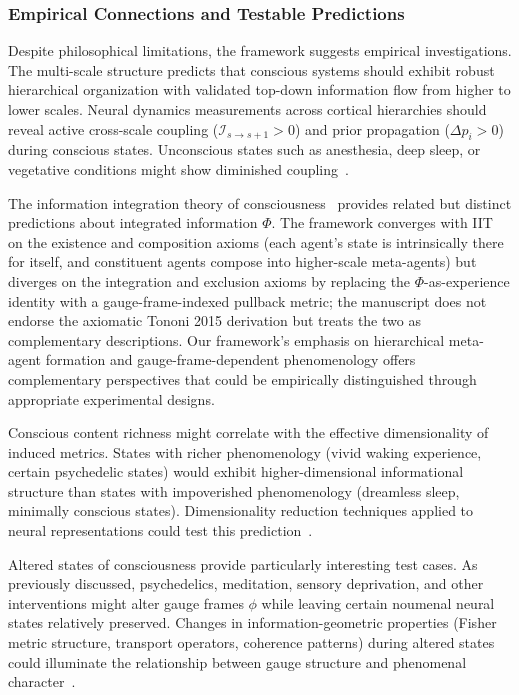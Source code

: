 \documentclass[11pt]{article}
\begin{document}
\subsubsection{Empirical Connections and Testable Predictions}

Despite philosophical limitations, the framework suggests empirical investigations. The multi-scale structure predicts that conscious systems should exhibit robust hierarchical organization with validated top-down information flow from higher to lower scales. Neural dynamics measurements across cortical hierarchies should reveal active cross-scale coupling ($\mathcal{I}_{s \to s+1} > 0$) and prior propagation ($\Delta p_i > 0$) during conscious states. Unconscious states such as anesthesia, deep sleep, or vegetative conditions might show diminished coupling~\cite{Mashour2020, Luppi2021}.

The information integration theory of consciousness~\cite{Tononi2004, Tononi2016} provides related but distinct predictions about integrated information $\Phi$. The framework converges with IIT on the existence and composition axioms (each agent's state is intrinsically there for itself, and constituent agents compose into higher-scale meta-agents) but diverges on the integration and exclusion axioms by replacing the $\Phi$-as-experience identity with a gauge-frame-indexed pullback metric; the manuscript does not endorse the axiomatic Tononi 2015 derivation but treats the two as complementary descriptions. Our framework's emphasis on hierarchical meta-agent formation and gauge-frame-dependent phenomenology offers complementary perspectives that could be empirically distinguished through appropriate experimental designs.

Conscious content richness might correlate with the effective dimensionality of induced metrics. States with richer phenomenology (vivid waking experience, certain psychedelic states) would exhibit higher-dimensional informational structure than states with impoverished phenomenology (dreamless sleep, minimally conscious states). Dimensionality reduction techniques applied to neural representations could test this prediction~\cite{Gao2017, Shine2019}.

Altered states of consciousness provide particularly interesting test cases. As previously discussed, psychedelics, meditation, sensory deprivation, and other interventions might alter gauge frames $\phi$ while leaving certain noumenal neural states relatively preserved. Changes in information-geometric properties (Fisher metric structure, transport operators, coherence patterns) during altered states could illuminate the relationship between gauge structure and phenomenal character~\cite{Carhart-Harris2014, Milliere2018}.
\end{document}
